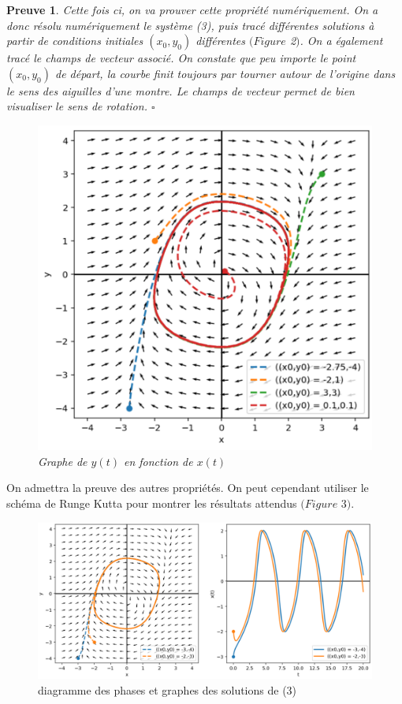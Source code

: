 \documentclass{article}
\newtheorem{preuve}{Preuve}
\begin{document}
\begin{preuve}

Cette fois ci, on va prouver cette propriété numériquement. 
On a donc résolu numériquement le système (3), puis tracé différentes solutions à partir de conditions initiales $(x_0,y_0)$ différentes $(Figure$ 2$)$.
On a également tracé le champs de vecteur associé. On constate que peu importe le point $(x_0,y_0)$ de départ, la courbe finit toujours par tourner autour de l'origine dans le sens des aiguilles d'une montre.
Le champs de vecteur permet de bien visualiser le sens de rotation. $\square$

\begin{figure}[!h]
\centering
\includegraphics[scale=0.4]{../images/plot_solh.png}
\caption{Graphe de $y(t)$ en fonction de $x(t)$}
\end{figure}

\end{preuve}

On admettra la preuve des autres propriétés. On peut cependant utiliser le schéma de Runge Kutta pour montrer les résultats attendus $(Figure$ 3$)$.

\begin{figure}[!h]
\centering
\includegraphics[scale=0.4]{../images/dphase.png}
\caption{diagramme des phases et graphes des solutions de (3)}
\end{figure}
\end{document}
